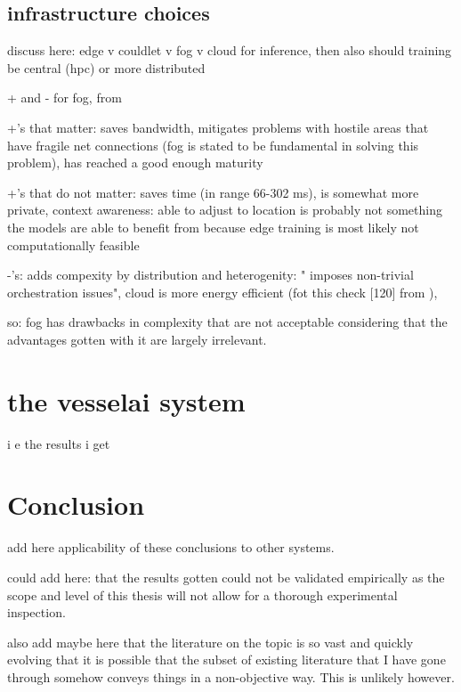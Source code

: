 \section{infrastructure choices}

discuss here: edge v couldlet v fog v cloud for inference, then also should training be central (hpc) or more distributed

+ and - for fog, from \cite{fogsurvey}

+'s that matter: saves bandwidth, mitigates problems with hostile areas that have fragile net connections (fog is stated to be fundamental in solving this problem), has reached a good enough maturity

+'s that do not matter: saves time (in range 66-302 ms), is somewhat more private, context awareness: able to adjust to location is probably not something the models are able to benefit from because edge training is most likely not computationally feasible

-'s: adds compexity by distribution and heterogenity: " imposes non-trivial orchestration issues", cloud is more energy efficient (fot this check [120] from \cite{fogsurvey}),

so: fog has drawbacks in complexity that are not acceptable considering that the advantages gotten with it are largely irrelevant.

\chapter{the vesselai system}

i e the results i get

\chapter{Conclusion}

add here applicability of these conclusions to other systems.

could add here: that the results gotten could not be validated empirically as the scope and level of this thesis will not allow for a thorough experimental inspection.

also add maybe here that the literature on the topic is so vast and quickly evolving that it is possible that the subset of existing literature that I have gone through somehow conveys things in a non-objective way. This is unlikely however.

